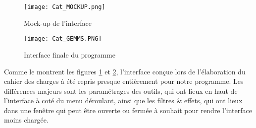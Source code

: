 \begin{figure}[H]
	\caption{Mock-up de l'interface}
	\centering
	\texttt{[image: Cat\_MOCKUP.png]}
	\label{fig:cat_mockup}
\end{figure}

\begin{figure}[H]
	\caption{Interface finale du programme}
	\centering	
	\texttt{[image: Cat\_GEMMS.PNG]}
	\label{fig:cat_gemms}
\end{figure}

Comme le montrent les figures \ref{fig:cat_mockup} et \ref{fig:cat_gemms}, l'interface conçue lors de l'élaboration du cahier des charges à été repris presque entièrement pour notre programme. Les différences majeurs sont les paramétrages des outils, qui ont lieux en haut de l'interface à coté du menu déroulant, ainsi que les filtres \& effets, qui ont lieux dans une fenêtre qui peut être ouverte ou fermée à souhait pour rendre l'interface moins chargée. 